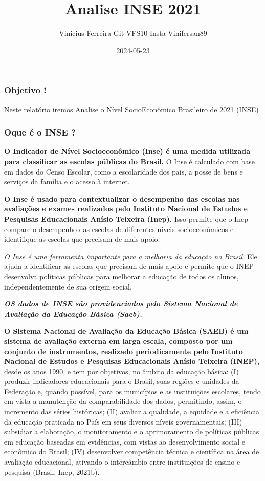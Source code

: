 \documentclass[
]{article}
\title{Analise INSE 2021}
\author{Vinicius Ferreira Git-VFS10 Insta-Vinifersan89}
\date{2024-05-23}
\begin{document}
\maketitle

\subsubsection{Objetivo !}\label{objetivo}

Neste relatório iremos Analise o Nível SocioEconômico Brasileiro de 2021
(INSE)

\subsubsection{Oque é o INSE ?}\label{oque-uxe9-o-inse}

\textbf{O Indicador de Nível Socioeconômico (Inse) é uma medida
utilizada para classificar as escolas públicas do Brasil.} O Inse é
calculado com base em dados do Censo Escolar, como a escolaridade dos
pais, a posse de bens e serviços da família e o acesso à internet.

\textbf{O Inse é usado para contextualizar o desempenho das escolas nas
avaliações e exames realizados pelo Instituto Nacional de Estudos e
Pesquisas Educacionais Anísio Teixeira (Inep).} Isso permite que o Inep
compare o desempenho das escolas de diferentes níveis socioeconômicos e
identifique as escolas que precisam de mais apoio.

\emph{O Inse é uma ferramenta importante para a melhoria da educação no
Brasil.} Ele ajuda a identificar as escolas que precisam de mais apoio e
permite que o INEP desenvolva políticas públicas para melhorar a
educação de todos os alunos, independentemente de sua origem social.

\textbf{\emph{OS dados de INSE são providenciados pelo Sistema Nacional
de Avaliação da Educação Básica (Saeb).}}

\textbf{O Sistema Nacional de Avaliação da Educação Básica (SAEB) é um
sistema de avaliação externa em larga escala, composto por um conjunto
de instrumentos, realizado periodicamente pelo Instituto Nacional de
Estudos e Pesquisas Educacionais Anísio Teixeira (INEP),} desde os anos
1990, e tem por objetivos, no âmbito da educação básica: (I) produzir
indicadores educacionais para o Brasil, suas regiões e unidades da
Federação e, quando possível, para os municípios e as instituições
escolares, tendo em vista a manutenção da comparabilidade dos dados,
permitindo, assim, o incremento das séries históricas; (II) avaliar a
qualidade, a equidade e a eficiência da educação praticada no País em
seus diversos níveis governamentais; (III) subsidiar a elaboração, o
monitoramento e o aprimoramento de políticas públicas em educação
baseadas em evidências, com vistas ao desenvolvimento social e econômico
do Brasil; (IV) desenvolver competência técnica e científica na área de
avaliação educacional, ativando o intercâmbio entre instituições de
ensino e pesquisa (Brasil. Inep, 2021b).
\end{document}
